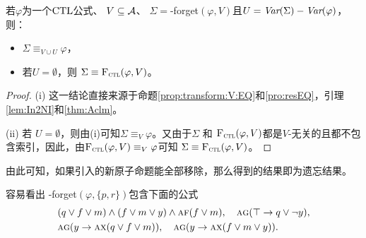 \begin{theorem}\label{thm:soundness:forget:algorithm}
	若$\varphi$为一个$\textrm{CTL}$公式、 $V\subseteq\cal A$、 $\Sigma=$\CTL-forget$(\varphi,V)$且$U=\textit{Var}(\Sigma)-\textit{Var}(\varphi)$，则：
	\begin{itemize}
		\item[(i)] $\Sigma\equiv_{V\cup U}\varphi$，
		\item[(ii)] 若$U=\emptyset$，则 $\Sigma\equiv{\textsc{F}_{\textsc{ctl}}}(\varphi,V)$。
	\end{itemize}
\end{theorem}
\begin{proof}
	(i) 这一结论直接来源于命题\ref{prop:transform:V:EQ}和\ref{pro:resEQ}，引理\ref{lem:In2NI}和\ref{thm:Aclm}。
	
	(ii) 若 $U=\emptyset$，则由(i)可知$\Sigma\equiv_{V}\varphi$。又由于$\Sigma$ 和 ${\textsc{F}_{\textsc{ctl}}}(\varphi,V)$都是$V$-无关的且都不包含索引，因此，由${\textsc{F}_{\textsc{ctl}}}(\varphi,V) \equiv_V \varphi$可知 $\Sigma\equiv{\textsc{F}_{\textsc{ctl}}}(\varphi,V)$。
\end{proof}

由此可知，如果引入的新原子命题能全部移除，那么得到的结果即为遗忘结果。

\begin{example}\label{examp:forget:algorithm}
	容易看出 \CTL-forget$(\varphi,\{p,r\})$包含下面的公式
	\begin{align*}%
		&  (q \vee f \vee m)\land (f \vee m \vee y)\land\ALL \FUTURE (f \vee m), \quad \ALL\GLOBAL ( \top \rto q\vee\neg y),  \\
		&  \ALL\GLOBAL(y \rto \ALL\NEXT(q \vee f\vee m)), \quad \ALL\GLOBAL( y \rto \ALL\NEXT(f\vee m\vee y)).
	\end{align*}
\end{example}


